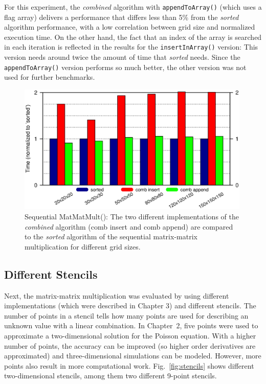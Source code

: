 For this experiment, the \textit{combined} algorithm with \texttt{appendToArray()} (which uses a flag array) delivers a performance that differs less than 5\% from the \textit{sorted} algorithm performance, with a low correlation between grid size and normalized execution time. On the other hand, the fact that an index of the array is searched in each iteration is reflected in the results for the \texttt{insertInArray()} version: This version needs around twice the amount of time that \textit{sorted} needs. Since the \texttt{appendToArray()} version performs so much better, the other version was not used for further benchmarks.

\begin{figure}[tb]
	\centering
	\includegraphics[width=0.99\textwidth, trim={0 2.cm 0 7cm},clip]{seq_insert_append}
	\caption{Sequential MatMatMult(): The two different implementations of the \textit{combined} algorithm (comb insert and comb append) are compared to the \textit{sorted} algorithm of the sequential matrix-matrix multiplication for different grid sizes.} 
	\label{fig:ex209_insert_append_3d19p}
\end{figure}

\subsection{Different Stencils}
Next, the matrix-matrix multiplication was evaluated by using different implementations (which were described in Chapter 3) and different stencils. The number of points in a stencil tells how many points are used for describing an unknown value with a linear combination. In Chapter~2, five points were used to approximate a two-dimensional solution for the Poisson equation. With a higher number of points, the accuracy can be improved (so higher order derivatives are approximated) and three-dimensional simulations can be modeled. However, more points also result in more computational work. Fig.~\ref{fig:stencils} shows different two-dimensional stencils, among them two different 9-point stencils. 

